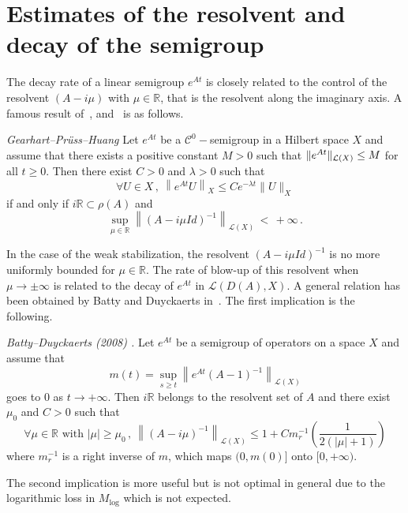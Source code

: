 \documentclass[AHL,Unicode,longabstracts]{cedram}
\newcommand{\RR}{\mathbb{R}}
\newcommand{\Cc}{\mathcal{C}}
\newcommand{\Lc}{\mathcal{L}}
\let\oldforall\forall
\renewcommand*{\forall}{\mathrel{\oldforall}}
\begin{document}
\section{Estimates of the resolvent and decay of the semigroup}

The decay rate of a linear semigroup $e^{At}$ is closely related to the control of the resolvent $(A-i\mu)$ with $\mu\in\RR$, that is the resolvent along the imaginary axis. A famous result of~\cite{Ge}, \cite{Pruss} and~\cite{Huang} is as follows.

\begin{theo}
\emph{Gearhart--Pr\"uss--Huang}\label{th-Huang}
Let $e^{At}$ be a $\Cc^0-$semigroup in a Hilbert space $X$ and assume that there exists a positive constant $M>0$ such that $\|e^{At}\|_{\Lc(X)}\linebreak\leq M$ for all $t\geq 0$. Then there exist $C>0$ and $\lambda >0$ such that
\[
\forall U\in X\,,\:\left\|e^{At}U\right\|_{X} \leq Ce^{-\lambda t} \|U\|_X
\]
if and only if $i\RR\subset \rho(A)$ and
\[
\sup_{\mu\in\RR} \left\|(A-i\mu Id)^{-1}\right\|_{\Lc(X)}\,<\,+\infty\,.
\]
\end{theo}

In the case of the weak stabilization, the resolvent $(A-i\mu Id)^{-1}$ is no more uniformly bounded for $\mu\in\RR$. The rate of blow-up of this resolvent when $\mu\rightarrow \pm\infty$ is related to the decay of $e^{At}$ in $\Lc(D(A),X)$. A general relation has been obtained by Batty and Duyckaerts in~\cite{Batty-Duyckaerts}. The first implication is the following.

\begin{theo}\label{th-BD-1}
\emph{Batty--Duyckaerts (2008) \cite[Proposition~1.3]{Batty-Duyckaerts}.}
Let $e^{At}$ be a semigroup of operators on a space $X$ and assume that
\[
m(t)=\sup_{s\geq t} \left\|e^{At}(A-1)^{-1}\right\|_{\Lc(X)}
\]
goes to $0$ as $t\rightarrow +\infty$. Then $i\RR$ belongs to the resolvent set of $A$ and there exist $\mu_0$ and $C>0$ such that
\[
\forall \mu\in \RR\text{ with }|\mu|\geq \mu_0\,,\:
\left\|(A-i\mu)^{-1}\right\|_{\Lc(X)}\leq 1 + C m^{-1}_r \left(\frac 1{2(|\mu|+1)}\right)
\]
where $m^{-1}_r$ is a right inverse of $m$, which maps $(0,m(0)]$ onto $[0,+\infty)$.
\end{theo}

The second implication is more useful but is not optimal in general due to the logarithmic loss in $M_{\log}$ which is not expected.
\end{document}
